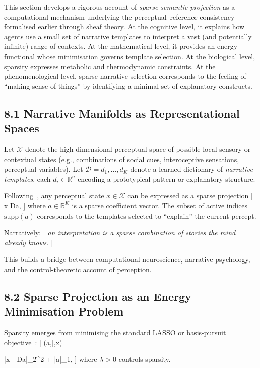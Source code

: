 \documentclass[11pt,a4paper,twoside]{article}
\begin{document}
This section develops a rigorous account of \emph{sparse semantic projection} as a computational mechanism underlying the perceptual--reference consistency formalised earlier through sheaf theory. At the cognitive level, it explains how agents use a small set of narrative templates to interpret a vast (and potentially infinite) range of contexts. At the mathematical level, it provides an energy functional whose minimisation governs template selection. At the biological level, sparsity expresses metabolic and thermodynamic constraints. At the phenomenological level, sparse narrative selection corresponds to the feeling of ``making sense of things'' by identifying a minimal set of explanatory constructs.

\subsection{8.1 Narrative Manifolds as Representational Spaces}

Let $\mathcal{X}$ denote the high-dimensional perceptual space of possible local sensory or contextual states (e.g., combinations of social cues, interoceptive sensations, perceptual variables). Let $\mathcal{D}={d_1,\dots,d_K}$ denote a learned dictionary of \emph{narrative templates}, each $d_i\in\mathbb{R}^n$ encoding a prototypical pattern or explanatory structure.

Following~\cite{elad2010sparse,mairal2009supervised}, any perceptual state $x\in\mathcal{X}$ can be expressed as a sparse projection
[
x \approx Da,
]
where $a\in\mathbb{R}^K$ is a sparse coefficient vector. The subset of active indices $\mathrm{supp}(a)$ corresponds to the templates selected to ``explain'' the current percept.

Narratively:
[
\textit{an interpretation is a sparse combination of stories the mind already knows.}
]

This builds a bridge between computational neuroscience, narrative psychology, and the control-theoretic account of perception.

\subsection{8.2 Sparse Projection as an Energy Minimisation Problem}

Sparsity emerges from minimising the standard LASSO or basis-pursuit objective~\cite{tibshirani1996lasso,donoho2006compressed}:
[
(a,|,x)
==================

|x - Da|_2^2 + \lambda |a|_1,
]
where $\lambda>0$ controls sparsity.
\end{document}
